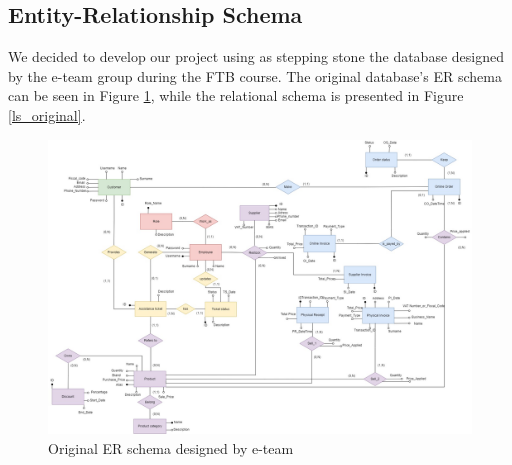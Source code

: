 \subsection{Entity-Relationship Schema}

We decided to develop our project using as stepping stone the database designed by the e-team group during the FTB course. The original database's ER schema can be seen in Figure \ref{er_original}, while the relational schema is presented in Figure \ref{ls_original}.
\\
\begin{figure}[H]
\centering
\includegraphics[width=16.5cm]{Schemas/ER_original.jpg}
\caption{Original ER schema designed by e-team}
\label{er_original}
\end{figure}

